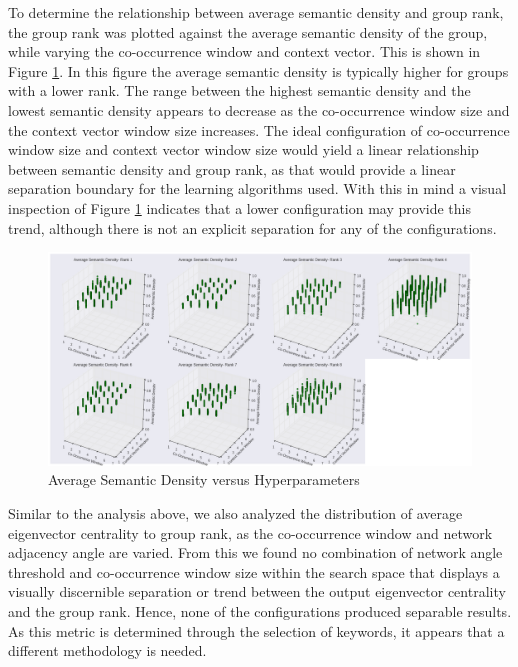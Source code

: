\documentclass[11pt, a4paper]{article}
\begin{document}
To determine the relationship between average semantic density and group rank, the group rank was plotted against the average semantic density of the group, while varying the co-occurrence window and context vector.  This is shown in Figure \ref{fig:multipleAVGSD}.  In this figure the average semantic density is typically higher for groups with a lower rank. The range between the highest semantic density and the lowest semantic density appears to decrease as the co-occurrence window size and the context vector window size increases. The ideal configuration of co-occurrence window size and context vector window size would yield a linear relationship between semantic density and group rank, as that would provide a linear separation boundary for the learning algorithms used. With this in mind a visual inspection of Figure \ref{fig:multipleAVGSD} indicates that a lower configuration may provide this trend, although there is not an explicit separation for any of the configurations.

\begin{figure}[!h]
\begin{center}
\includegraphics[width = \textwidth]{figs/multipleAVGSD}
\caption{Average Semantic Density versus Hyperparameters}
\label{fig:multipleAVGSD}
\end{center}
\end{figure}

Similar to the analysis above, we also analyzed the distribution of average eigenvector centrality to group rank, as the co-occurrence window and network adjacency angle are varied. From this we found no combination of network angle threshold and co-occurrence window size within the search space that displays a visually discernible separation or trend between the output eigenvector centrality and the group rank. Hence, none of the configurations produced separable results. As this metric is determined through the selection of keywords, it appears that a different methodology is needed.
\end{document}
